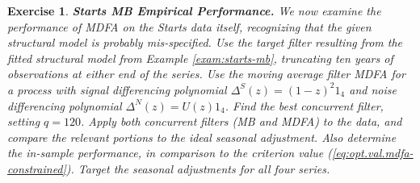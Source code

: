 \documentclass[a4paper]{book}
\newtheorem{Exercise}{Exercise}
\begin{document}
 

\begin{Exercise} {\bf Starts MB Empirical Performance.}  \rm
\label{exer:starts-mb3}
 We now examine the performance of MDFA   on the Starts data itself,
 recognizing that the given structural model is probably mis-specified.  
 Use the target filter resulting from the  fitted structural model
  from Example \ref{exam:starts-mb}, truncating ten years of observations at either end
   of the series.  
 Use the moving average filter  MDFA  for a process with signal
 differencing polynomial $\Delta^S (z) = {(1-z)}^2 1_4$ and noise 
  differencing polynomial $\Delta^N (z) = U(z) 1_4$.  Find the best
 concurrent filter, setting $q= 120$.
  Apply both concurrent filters (MB and MDFA)
 to the data, and compare the relevant portions to the ideal seasonal adjustment.
 Also determine the in-sample performance, in comparison to the criterion value
 (\ref{eq:opt.val.mdfa-constrained}).   Target the seasonal adjustments for all
  four series.
\end{Exercise}
     
  
\end{document}
